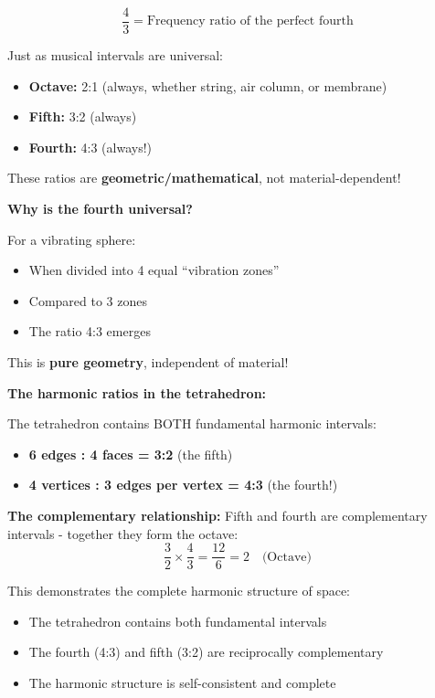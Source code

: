 \begin{equation}
	\frac{4}{3} = \text{Frequency ratio of the perfect fourth}
\end{equation}

Just as musical intervals are universal:
\begin{itemize}
	\item \textbf{Octave:} 2:1 (always, whether string, air column, or membrane)
	\item \textbf{Fifth:} 3:2 (always)
	\item \textbf{Fourth:} 4:3 (always!)
\end{itemize}

These ratios are \textbf{geometric/mathematical}, not material-dependent!

\textbf{Why is the fourth universal?}

For a vibrating sphere:
\begin{itemize}
	\item When divided into 4 equal ``vibration zones''
	\item Compared to 3 zones
	\item The ratio 4:3 emerges
\end{itemize}

This is \textbf{pure geometry}, independent of material!

\textbf{The harmonic ratios in the tetrahedron:}

The tetrahedron contains BOTH fundamental harmonic intervals:
\begin{itemize}
	\item \textbf{6 edges : 4 faces = 3:2} (the fifth)
	\item \textbf{4 vertices : 3 edges per vertex = 4:3} (the fourth!)
\end{itemize}

\textbf{The complementary relationship:}
Fifth and fourth are complementary intervals - together they form the octave:
\begin{equation}
	\frac{3}{2} \times \frac{4}{3} = \frac{12}{6} = 2 \quad \text{(Octave)}
\end{equation}

This demonstrates the complete harmonic structure of space:
\begin{itemize}
	\item The tetrahedron contains both fundamental intervals
	\item The fourth (4:3) and fifth (3:2) are reciprocally complementary
	\item The harmonic structure is self-consistent and complete
\end{itemize}

